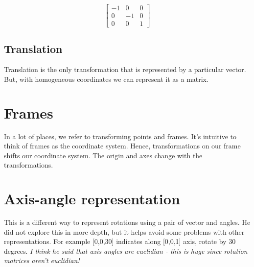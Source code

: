 \begin{equation}
\begin{bmatrix}
-1 & 0 & 0\\
0 & -1 & 0 \\
0 & 0 & 1
\end{bmatrix}
\end{equation}

\subsection{Translation}

Translation is the only transformation that is represented by a particular vector. But, with homogeneous coordinates we can represent it as a matrix.

\section{Frames}

In a lot of places, we refer to transforming points and frames. It's intuitive to think of frames as the coordinate system. Hence, transformations on our frame shifts our coordinate system. The origin and axes change with the transformations.

\section{Axis-angle representation}

This is a different way to represent rotations using a pair of vector and angles. He did not explore this in more depth, but it helps avoid some problems with other representations. For example [0,0,30] indicates along [0,0,1] axis, rotate by 30 degrees. \textit{I think he said that axis angles are euclidian - this is huge since rotation matrices aren't euclidian!}